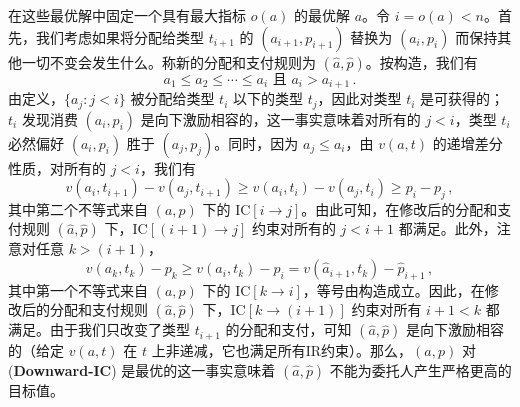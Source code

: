 \documentclass[12pt,letterpaper]{article}
\newenvironment{translation}{\color{blue}\noindent}{}
\theoremstyle{plain}
\theoremstyle{definition}
\theoremstyle{remark}
\renewcommand{\1}{\mathds{1}}
\theoremstyle{definition}
\begin{document}
\begin{translation}
在这些最优解中固定一个具有最大指标 $o(a)$ 的最优解 $a$。令 $i = o(a) < n$。首先，我们考虑如果将分配给类型 $t_{i+1}$ 的 $(a_{i+1}, p_{i+1})$ 替换为 $(a_i, p_i)$ 而保持其他一切不变会发生什么。称新的分配和支付规则为 $(\hat{a}, \hat{p})$。按构造，我们有
\[a_1 \leq a_2 \leq \cdots \leq a_i \text{ 且 } a_i > a_{i+1}\,.\]
由定义，$\{a_j: j < i\}$ 被分配给类型 $t_i$ 以下的类型 $t_j$，因此对类型 $t_i$ 是可获得的；$t_i$ 发现消费 $(a_i, p_i)$ 是向下激励相容的，这一事实意味着对所有的 $j < i$，类型 $t_i$ 必然偏好 $(a_i, p_i)$ 胜于 $(a_j, p_j)$。同时，因为 $a_j \leq a_i$，由 $v(a, t)$ 的递增差分性质，对所有的 $j < i$，我们有
\[v(a_i, t_{i+1}) - v(a_j, t_{i+1}) \geq v(a_i, t_{i}) - v(a_j, t_{i}) \geq p_i - p_j \,, \]
其中第二个不等式来自 $(a, p)$ 下的 IC$[i \rightarrow j]$。由此可知，在修改后的分配和支付规则 $(\hat{a}, \hat{p})$ 下，IC$[(i+1) \rightarrow j]$ 约束对所有的 $j < i+1$ 都满足。此外，注意对任意 $k > (i+1)$，
\[v(a_k, t_k) - p_k \geq v(a_{i}, t_k) - p_i = v(\hat{a}_{i+1}, t_k) - \hat{p}_{i+1}\,,\]
其中第一个不等式来自 $(a, p)$ 下的 IC$[k \rightarrow i]$，等号由构造成立。因此，在修改后的分配和支付规则 $(\hat{a}, \hat{p})$ 下，IC$[k \rightarrow (i+1)]$ 约束对所有 $i+1 < k$ 都满足。由于我们只改变了类型 $t_{i+1}$ 的分配和支付，可知 $(\hat{a}, \hat{p})$ 是向下激励相容的（给定 $v(a, t)$ 在 $t$ 上非递减，它也满足所有IR约束）。那么，$(a, p)$ 对 (\textbf{Downward-IC}) 是最优的这一事实意味着 $(\hat{a}, \hat{p})$ 不能为委托人产生严格更高的目标值。
\end{translation}
\end{document}
